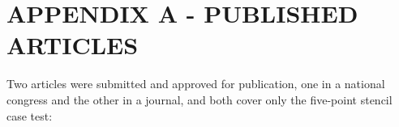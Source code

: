 \renewcommand{\thechapter}{A}
\chapter{APPENDIX A - PUBLISHED ARTICLES}
\label{appendixA}

Two articles were submitted and approved for publication, one in a national congress and the other in a journal, and both cover only the five-point stencil case test:

